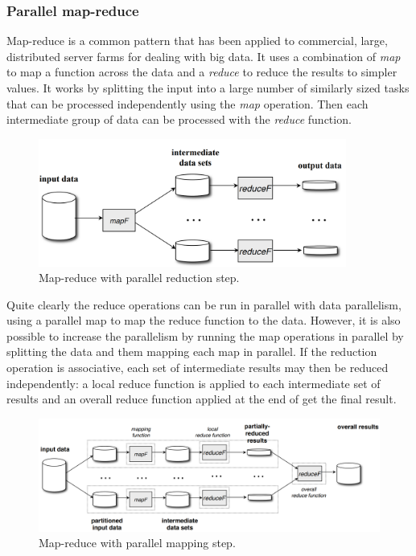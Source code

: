 \documentclass[CS4204-Notes.tex]{subfiles}
\begin{document}
\subsubsection{Parallel map-reduce}
Map-reduce is a common pattern that has been applied to commercial, large, distributed server farms for dealing with big data. It uses a combination of \textit{map} to map a function across the data and a \textit{reduce} to reduce the results to simpler values. It works by splitting the input into a large number of similarly sized tasks that can be processed independently using the \textit{map} operation. Then each intermediate group of data can be processed with the \textit{reduce} function. 
\begin{figure}[H]
\centering
\includegraphics[width=0.9\textwidth, keepaspectratio]{imgs/map-reduce-simple.png}
\caption{Map-reduce with parallel reduction step.}
\end{figure}
\noindent
Quite clearly the reduce operations can be run in parallel with data parallelism, using a parallel map to map the reduce function to the data. However, it is also possible to increase the parallelism by running the map operations in parallel by splitting the data and them mapping each map in parallel. If the reduction operation is associative, each set of intermediate results may then be reduced independently: a local reduce function is applied to each intermediate set of results and an overall reduce function applied at the end of get the final result. 
\begin{figure}[H]
\centering
\includegraphics[width=1\textwidth, keepaspectratio]{imgs/map-reduce-more.png}
\caption{Map-reduce with parallel mapping step.}
\end{figure}
\end{document}
